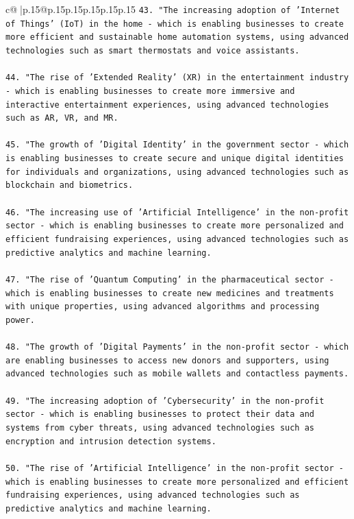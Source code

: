 \documentclass{article}
\begin{document}
{\begin{supertabular}{c@{$\;$}|p{.15\linewidth}@{}p{.15\linewidth}p{.15\linewidth}p{.15\linewidth}p{.15\linewidth}p{.15\linewidth}}
{{{\texttt{43. "The increasing adoption of 'Internet of Things' (IoT) in the home {-} which is enabling businesses to create more efficient and sustainable home automation systems, using advanced technologies such as smart thermostats and voice assistants.} \\
\\ 
\texttt{44. "The rise of 'Extended Reality' (XR) in the entertainment industry {-} which is enabling businesses to create more immersive and interactive entertainment experiences, using advanced technologies such as AR, VR, and MR.} \\
\\ 
\texttt{45. "The growth of 'Digital Identity' in the government sector {-} which is enabling businesses to create secure and unique digital identities for individuals and organizations, using advanced technologies such as blockchain and biometrics.} \\
\\ 
\texttt{46. "The increasing use of 'Artificial Intelligence' in the non{-}profit sector {-} which is enabling businesses to create more personalized and efficient fundraising experiences, using advanced technologies such as predictive analytics and machine learning.} \\
\\ 
\texttt{47. "The rise of 'Quantum Computing' in the pharmaceutical sector {-} which is enabling businesses to create new medicines and treatments with unique properties, using advanced algorithms and processing power.} \\
\\ 
\texttt{48. "The growth of 'Digital Payments' in the non{-}profit sector {-} which are enabling businesses to access new donors and supporters, using advanced technologies such as mobile wallets and contactless payments.} \\
\\ 
\texttt{49. "The increasing adoption of 'Cybersecurity' in the non{-}profit sector {-} which is enabling businesses to protect their data and systems from cyber threats, using advanced technologies such as encryption and intrusion detection systems.} \\
\\ 
\texttt{50. "The rise of 'Artificial Intelligence' in the non{-}profit sector {-} which is enabling businesses to create more personalized and efficient fundraising experiences, using advanced technologies such as predictive analytics and machine learning.} \\
}}}
\end{supertabular}}
\end{document}
